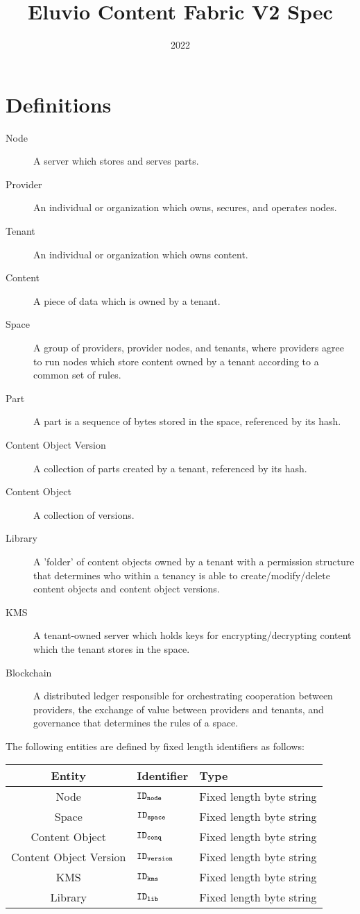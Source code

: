 \documentclass{article}
\title{Eluvio Content Fabric V2 Spec}
\date{2022}
\begin{document}
\maketitle



\setcounter{section}{-1}
\section{Definitions}
\begin{description}
  \item[Node] A server which stores and serves parts.
  \item[Provider] An individual or organization which owns, secures, and operates nodes.
  \item[Tenant] An individual or organization which owns content.
  \item[Content] A piece of data which is owned by a tenant.
  \item[Space] A group of providers, provider nodes, and tenants, where providers agree to run nodes which store content owned by a tenant according to a common set of rules.
  \item[Part] A part is a sequence of bytes stored in the space, referenced by its hash. 
  \item[Content Object Version] A collection of parts created by a tenant, referenced by its hash.
  \item[Content Object] A collection of versions.
  \item[Library] A 'folder' of content objects owned by a tenant with a permission structure that determines who within a tenancy is able to create/modify/delete content objects and content object versions.
  \item[KMS] A tenant-owned server which holds keys for encrypting/decrypting content which the tenant stores in the space.
  \item[Blockchain] A distributed ledger responsible for orchestrating cooperation between providers, the exchange of value between providers and tenants, and governance that determines the rules of a space.
\end{description}

The following entities are defined by fixed length identifiers as follows:
\begin{center}
  \begin{tabular}{| c | l | l |}
    \hline
    Entity & Identifier & Type \\
    \hline 
    Node & $\mathtt{ID_{node}}$ & Fixed length byte string \\
    Space & $\mathtt{ID_{space}}$ & Fixed length byte string \\
    Content Object & $\mathtt{ID_{conq}}$ & Fixed length byte string \\
    Content Object Version & $\mathtt{ID_{version}}$ & Fixed length byte string \\
    KMS & $\mathtt{ID_{kms}}$ & Fixed length byte string \\
    Library & $\mathtt{ID_{lib}}$ & Fixed length byte string \\
    \hline 
  \end{tabular}
\end{center}
\end{document}
